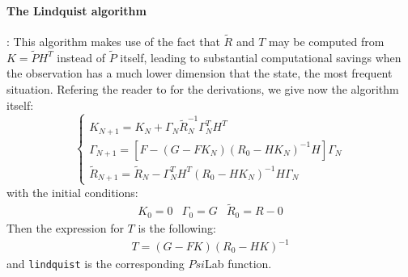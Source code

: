 \paragraph{The Lindquist algorithm} \cite{faurre}:
This algorithm makes use of the fact that 
$\tilde{R}$ and $T$ may be computed from $K=\tilde{P}H^T$ instead 
of $\tilde{P}$ itself, leading to substantial computational
savings when the observation has a much 
lower dimension that the state, the most frequent situation.
Refering the reader to \cite{faurre} for the derivations, we give now 
the algorithm itself: 
\begin{equation}
\left\{ 
\begin{array}{l} 
K_{N+1}=K_N+ \Gamma _N \tilde{R}^{-1}_N \Gamma ^T_N H^T \\
\Gamma_ {N+1}= [F-(G-FK_N)(R_0-HK_N)^{-1}H]\Gamma _N \\
\tilde{R}_{N+1}=\tilde{R}_N-\Gamma ^T_NH^T(R_0-HK_N)^{-1}H\Gamma _N
\label{e.ricc.36}
\end{array}
\right.
\end{equation}
with the initial conditions:
\begin{eqnarray}
K_0=0 & \Gamma _0=G & \tilde{R}_0=R-0
\label{e.ricc.37}
\end{eqnarray}
Then the expression for $T$ is the following:
\begin{eqnarray}
T=(G-FK)(R_0-HK)^{-1}
\label{e.ricc.38}
\end{eqnarray}
and {\tt lindquist} is the corresponding $Psi$Lab function.

